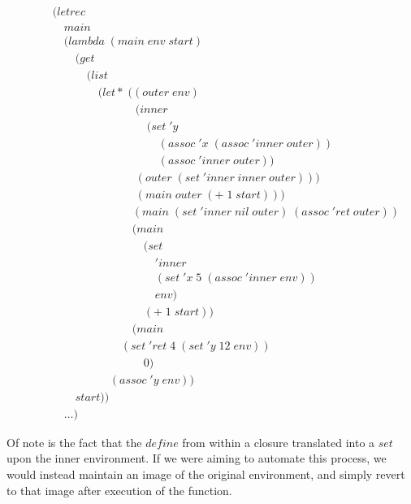\begin{figure}[htp]
\caption{}\label{fig:closureScope}
\begin{align*}
& (letrec \; 
\\& \quad main \; 
\\& \quad (lambda \; (main \; env \; start)
\\& \qquad (get \; 
\\& \qquad \quad (list \; 
\\& \qquad \qquad (let* \; ((outer \; env)
\\& \qquad \qquad \qquad \quad \; (inner \; 
\\& \qquad \qquad \qquad \qquad \; (set \; 'y \; 
\\& \qquad \qquad \qquad \qquad \quad \; (assoc \; 'x \; (assoc \; 'inner \; outer)) \; 
\\& \qquad \qquad \qquad \qquad \quad \; (assoc \; 'inner \; outer))
\\& \qquad \qquad \qquad \quad \; (outer \; (set \; 'inner \; inner \; outer)))
\\& \qquad \qquad \qquad \quad \; (main \; outer \; (+ \; 1 \; start)))
\\& \qquad \qquad \qquad \quad (main \; (set \; 'inner \; nil \; outer) \; (assoc \; 'ret \; outer))
\\& \qquad \qquad \qquad \quad (main \; 
\\& \qquad \qquad \qquad \qquad (set \; 
\\& \qquad \qquad \qquad \qquad \quad 'inner \; 
\\& \qquad \qquad \qquad \qquad \quad (set \; 'x \; 5 \; (assoc \; 'inner \; env)) \; 
\\& \qquad \qquad \qquad \qquad \quad env) \; 
\\& \qquad \qquad \qquad \qquad (+ \; 1 \; start))
\\& \qquad \qquad \qquad \quad (main \; 
\\& \qquad \qquad \qquad (set \; 'ret \; 4 \; (set \; 'y \; 12 \; env)) \; 
\\& \qquad \qquad \qquad \qquad 0)
\\& \qquad \qquad \quad (assoc \; 'y \; env)) \; 
\\& \qquad start))
\\& \quad \dots)
\end{align*}
\end{figure}

Of note is the fact that the $define$ from within a closure translated into a $set$
upon the inner environment. If we were aiming to automate this process, we would
instead maintain an image of the original environment, and simply revert to that 
image after execution of the function.

